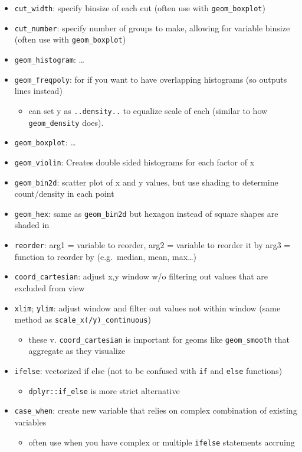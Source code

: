 \documentclass[]{book}
\providecommand{\tightlist}{%
  \setlength{\itemsep}{0pt}\setlength{\parskip}{0pt}}
\theoremstyle{definition}
\theoremstyle{definition}
\theoremstyle{definition}
\theoremstyle{remark}
\begin{document}
\begin{itemize}
\tightlist
\item
  \texttt{cut\_width}: specify binsize of each cut (often use with
  \texttt{geom\_boxplot})
\item
  \texttt{cut\_number}: specify number of groups to make, allowing for
  variable binsize (often use with \texttt{geom\_boxplot})
\item
  \texttt{geom\_histogram}: \ldots{}
\item
  \texttt{geom\_freqpoly}: for if you want to have overlapping
  histograms (so outputs lines instead)

  \begin{itemize}
  \tightlist
  \item
    can set y as \texttt{..density..} to equalize scale of each (similar
    to how \texttt{geom\_density} does).
  \end{itemize}
\item
  \texttt{geom\_boxplot}: \ldots{}
\item
  \texttt{geom\_violin}: Creates double sided histograms for each factor
  of x
\item
  \texttt{geom\_bin2d}: scatter plot of x and y values, but use shading
  to determine count/density in each point
\item
  \texttt{geom\_hex}: same as \texttt{geom\_bin2d} but hexagon instead
  of square shapes are shaded in
\item
  \texttt{reorder}: arg1 = variable to reorder, arg2 = variable to
  reorder it by arg3 = function to reorder by (e.g.~median, mean,
  max\ldots{})
\item
  \texttt{coord\_cartesian}: adjust x,y window w/o filtering out values
  that are excluded from view
\item
  \texttt{xlim}; \texttt{ylim}: adjust window and filter out values not
  within window (same method as \texttt{scale\_x(/y)\_continuous})

  \begin{itemize}
  \tightlist
  \item
    these v. \texttt{coord\_cartesian} is important for geoms like
    \texttt{geom\_smooth} that aggregate as they visualize
  \end{itemize}
\item
  \texttt{ifelse}: vectorized if else (not to be confused with
  \texttt{if} and \texttt{else} functions)

  \begin{itemize}
  \tightlist
  \item
    \texttt{dplyr::if\_else} is more strict alternative
  \end{itemize}
\item
  \texttt{case\_when}: create new variable that relies on complex
  combination of existing variables

  \begin{itemize}
  \tightlist
  \item
    often use when you have complex or multiple \texttt{ifelse}
    statements accruing
  \end{itemize}
\end{itemize}
\end{document}
